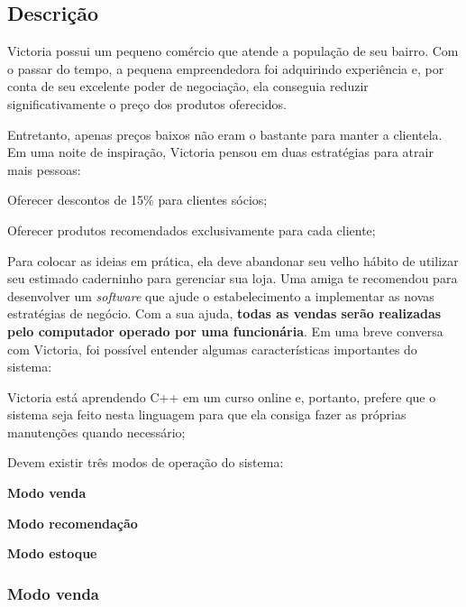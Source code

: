 \subsection*{Descrição}

Victoria possui um pequeno comércio que atende a população de seu bairro. Com o passar do tempo, a pequena empreendedora foi adquirindo experiência e, por conta de seu excelente poder de negociação, ela conseguia reduzir significativamente o preço dos produtos oferecidos.

Entretanto, apenas preços baixos não eram o bastante para manter a clientela. Em uma noite de inspiração, Victoria pensou em duas estratégias para atrair mais pessoas\+:
\begin{DoxyItemize}
\item Oferecer descontos de 15\% para clientes sócios;
\item Oferecer produtos recomendados exclusivamente para cada cliente;
\end{DoxyItemize}

Para colocar as ideias em prática, ela deve abandonar seu velho hábito de utilizar seu estimado caderninho para gerenciar sua loja. Uma amiga te recomendou para desenvolver um {\itshape software} que ajude o estabelecimento a implementar as novas estratégias de negócio. Com a sua ajuda, {\bfseries todas as vendas serão realizadas pelo computador operado por uma funcionária}. Em uma breve conversa com Victoria, foi possível entender algumas características importantes do sistema\+:
\begin{DoxyItemize}
\item Victoria está aprendendo C++ em um curso online e, portanto, prefere que o sistema seja feito nesta linguagem para que ela consiga fazer as próprias manutenções quando necessário;
\item Devem existir três modos de operação do sistema\+:
\begin{DoxyItemize}
\item {\bfseries Modo venda}
\item {\bfseries Modo recomendação}
\item {\bfseries Modo estoque}
\end{DoxyItemize}
\end{DoxyItemize}

\subsubsection*{Modo venda}

